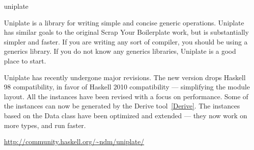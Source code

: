 \begin{hcarentry}{uniplate}
\label{uniplate}
\makeheader

Uniplate is a library for writing simple and concise generic operations.
Uniplate has similar goals to the original Scrap Your Boilerplate work,
but is substantially simpler and faster. If you are writing any sort of compiler,
you should be using a generics library. If you do not know any generics libraries,
Uniplate is a good place to start.

Uniplate has recently undergone major revisions. The new version drops Haskell 98
compatibility, in favor of Haskell 2010 compatibility --- simplifying the module layout.
All the instances have been revised with a focus on performance. Some of the instances
can now be generated by the Derive tool~\cref{Derive}. The instances based on the Data
class have been optimized and extended --- they now work on more types, and run faster.

\FurtherReading
\url{http://community.haskell.org/~ndm/uniplate/}
\end{hcarentry}
